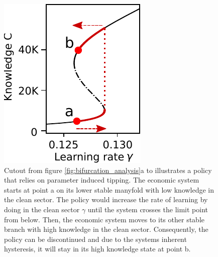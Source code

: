 \begin{figure}[t]


  \begin{minipage}[c]{0.65\textwidth}

      \caption[Policy that leverages parameter induced tipping in the economic system]{Cutout from figure \cref{fig:bifurcation_analysis}a to illustrates a policy that relies on parameter induced tipping. The economic system starts at point a on its lower stable manyfold with low knowledge in the clean sector. The policy would increase the rate of learning by doing in the clean sector $\gamma$ until the system crosses the limit point from below. Then, the economic system moves to its other stable branch with high knowledge in the clean sector. Consequently, the policy can be discontinued and due to the systems inherent hysteresis, it will stay in its high knowledge state at point b. \label{fig:tipping}}
  \end{minipage}\begin{minipage}[c]{0.35\textwidth}
      \hspace{10pt}\includegraphics[width = .9 \textwidth]{./figures/fig_ba_wide.pdf}
  \end{minipage}\hfill

 \end{figure}

